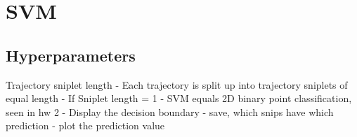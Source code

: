 
\section{SVM} \label{sec:svm}

\subsection{Hyperparameters}
Trajectory sniplet length
- Each trajectory is split up into trajectory sniplets of equal length
- If Sniplet length = 1 
	- SVM equals 2D binary point classification, seen in hw 2
	- Display the decision boundary
		- save, which snips have which prediction
		- plot the prediction value 